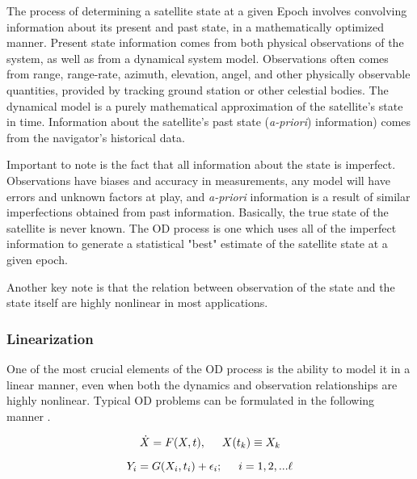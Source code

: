 \documentclass[12pt,a4paper,oneside]{article}
\numberwithin{equation}{section}   		%
\begin{document}
The process of determining a satellite state at a given Epoch involves convolving information about its present and past state, in a mathematically optimized manner. Present state information comes from both physical observations of the system, as well as from a dynamical system model. Observations often comes from range, range-rate, azimuth, elevation, angel, and other physically observable quantities, provided by tracking ground station or other celestial bodies. The dynamical model is a purely mathematical approximation of the satellite's state in time. Information about the satellite's past state (\emph{a-priori}) information) comes from the navigator's historical data. 

Important to note is the fact that all information about the state is imperfect. Observations have biases and accuracy in measurements, any model will have errors and unknown factors at play, and \emph{a-priori} information is a result of similar imperfections obtained from past information. Basically, the true state of the satellite is never known. The OD process is one which uses all of the imperfect information to generate a statistical "best" estimate of the satellite state at a given epoch. 

Another key note is that the relation between observation of the state and the state itself are highly nonlinear in most applications. 




\subsubsection{Linearization}
\label{sec:OD sub Linearization}
One of the most crucial elements of the OD process is the ability to model it in a linear manner, even when both the dynamics and observation relationships are highly nonlinear. Typical OD problems can be formulated in the following manner \cite{tapley2004statistical}. 

\begin{equation}
	\dot{X} = F(X,t), \hspace{0.5cm}     X(t_k) \equiv X_k
	\label{eq:FX}
\end{equation}
	
\begin{equation}
	Y_i = G(X_i,t_i) + \epsilon_i ; \hspace{0.5cm}   i=1,2,...\ell
	\label{eq:Yi}
\end{equation}
\end{document}
